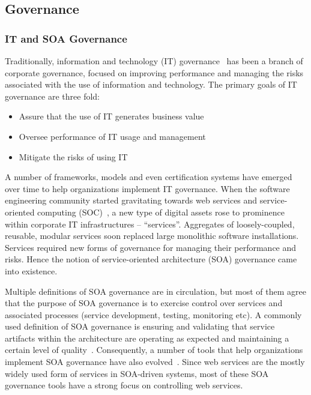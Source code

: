 \subsection{Governance}
\subsubsection{IT and SOA Governance}
Traditionally, information and technology (IT) governance~\cite{brown2005framing} has been a branch of 
corporate governance, focused on
improving performance and managing the risks associated with the use of information and technology. The primary
goals of IT governance are three fold:

\begin{itemize}
\item Assure that the use of IT generates business value
\item Oversee performance of IT usage and management
\item Mitigate the risks of using IT
\end{itemize}

A number of frameworks, models and even certification systems have emerged over time to help organizations 
implement IT governance. When the software engineering community started gravitating towards web services and
service-oriented computing (SOC)~\cite{1254461, what-is-soa}, a new type of digital assets rose to prominence within corporate IT 
infrastructures -- ``services''. Aggregates of loosely-coupled, reusable, modular services soon replaced 
large monolithic software
installations. Services required new forms of governance for managing their performance
and risks. Hence the notion of service-oriented architecture (SOA) governance came into existence. 

Multiple definitions of SOA governance
are in circulation, but most of them agree that the purpose of SOA governance is to exercise control over
services and associated processes (service development, testing, monitoring etc). A commonly used definition
of SOA governance is ensuring and validating that service artifacts within the architecture are operating
as expected and maintaining a certain level of quality~\cite{gartner-soa-gov}.
Consequently, a number of tools that help organizations implement SOA governance 
have also evolved~\cite{Schepers:2008:LAS:1363686.1363932,4730489,6478236,5577268}.
Since web services are the mostly widely used form of services in SOA-driven systems, most of these
SOA governance tools have a strong focus on controlling web services. 

